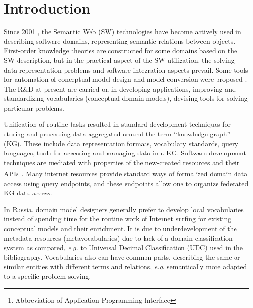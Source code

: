 \documentclass[
]{ceurart}
\begin{document}
\maketitle

\section{Introduction}

Since 2001 \cite{tbl}, the Semantic Web (SW) technologies have become actively used in describing software domains, representing semantic relations between objects.  First-order knowledge theories are constructed for some domains based on the SW description, but in the practical aspect of the SW utilization, the solving data representation problems and software integration aspects prevail.  Some tools for automation of conceptual model design and model conversion were proposed \cite{hogan}.  The R\&D at present are carried on in developing applications, improving and standardizing vocabularies (conceptual domain models), devising tools for solving particular problems.

Unification of routine tasks resulted in standard development techniques for storing and processing data aggregated around the term ``knowledge graph'' (KG).  These include data representation formats, vocabulary standards, query languages, tools for accessing and managing data in a KG.  Software development techniques are mediated with properties of the new-created resources and their APIs\footnote{Abbreviation of Application Programming Interface}.  Many internet resources provide standard ways of formalized domain data access using query endpoints, and these endpoints allow one to organize federated KG data access.

In Russia, domain model designers generally prefer to develop local vocabularies instead of spending time for the routine work of Internet surfing for existing conceptual models and their enrichment.  It is due to underdevelopment of the metadata resources (metavocabularies) due to lack of a domain classification system as compared, \emph{e.g.} to Universal Decimal Classification (UDC) used in the bibliography.  Vocabularies also can have common parts, describing the same or similar entities with different terms and relations, \emph{e.g.} semantically more adapted to a specific problem-solving.
\end{document}
